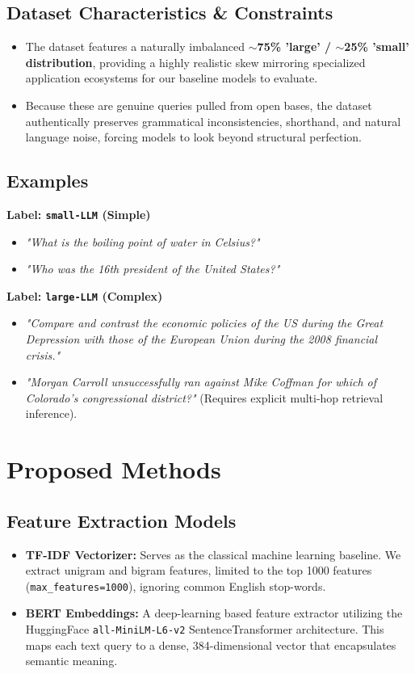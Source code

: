 \documentclass[12pt, a4paper]{article}
\begin{document}
\subsection{Dataset Characteristics \& Constraints}
\begin{itemize}
    \item The dataset features a naturally imbalanced \textbf{$\sim$75\% 'large' / $\sim$25\% 'small' distribution}, providing a highly realistic skew mirroring specialized application ecosystems for our baseline models to evaluate.
    \item Because these are genuine queries pulled from open bases, the dataset authentically preserves grammatical inconsistencies, shorthand, and natural language noise, forcing models to look beyond structural perfection.
\end{itemize}

\subsection{Examples}
\textbf{Label: \texttt{small-LLM} (Simple)}
\begin{itemize}
    \item \textit{"What is the boiling point of water in Celsius?"}
    \item \textit{"Who was the 16th president of the United States?"}
\end{itemize}

\textbf{Label: \texttt{large-LLM} (Complex)}
\begin{itemize}
    \item \textit{"Compare and contrast the economic policies of the US during the Great Depression with those of the European Union during the 2008 financial crisis."}
    \item \textit{"Morgan Carroll unsuccessfully ran against Mike Coffman for which of Colorado's congressional district?"} (Requires explicit multi-hop retrieval inference).
\end{itemize}

\section{Proposed Methods}

\subsection{Feature Extraction Models}
\begin{itemize}
    \item \textbf{TF-IDF Vectorizer:} Serves as the classical machine learning baseline. We extract unigram and bigram features, limited to the top 1000 features (\texttt{max\_features=1000}), ignoring common English stop-words.
    \item \textbf{BERT Embeddings:} A deep-learning based feature extractor utilizing the HuggingFace \texttt{all-MiniLM-L6-v2} SentenceTransformer architecture. This maps each text query to a dense, 384-dimensional vector that encapsulates semantic meaning.
\end{itemize}
\end{document}
